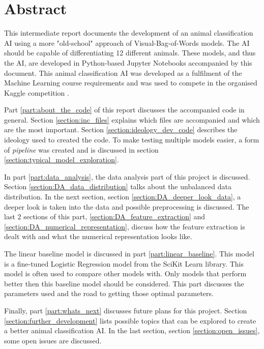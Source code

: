 \chapter*{Abstract}

This intermediate report documents the development of an animal classification AI using a more "old-school" approach of Visual-Bag-of-Words models.
The AI should be capable of differentiating 12 different animals.
These models, and thus the AI, are developed in Python-based Jupyter Notebooks accompanied by this document.
This animal classification AI was developed as a fulfilment  of the Machine Learning course requirements and was used to compete in the organised Kaggle competition \citep{kaggle_competition}.

Part \ref{part:about_the_code} of this report discusses the accompanied code in general.
Section \ref{section:inc_files} explains which files are accompanied and which are the most important. 
Section \ref{section:ideology_dev_code} describes the ideology used to created the code. 
To make testing multiple models easier, a form of \emph{pipeline} was created and is discussed in section \ref{section:typical_model_exploration}.

In part \ref{part:data_analysis}, the data analysis part of this project is discussed.
Section \ref{section:DA_data_distribution} talks about the unbalanced data distribution.
In the next section, section \ref{section:DA_deeper_look_data}, a deeper look is taken into the data and possible preprocessing is discussed.
The last 2 sections of this part, \ref{section:DA_feature_extraction} and \ref{section:DA_numerical_representation}, discuss how the feature extraction is dealt with and what the numerical representation looks like.

The linear baseline model is discussed in part \ref{part:linear_baseline}.
This model is a fine-tuned Logistic Regression model from the SciKit Learn library.
This model is often used to compare other models with.
Only models that perform better then this baseline model should be considered.
This part discusses the parameters used and the road to getting those optimal parameters.

Finally, part \ref{part:whats_next} discusses future plans for this project.
Section \ref{section:further_development} lists possible topics that can be explored to create a better animal classification AI.
In the last section, section \ref{section:open_issues}, some open issues are discussed.